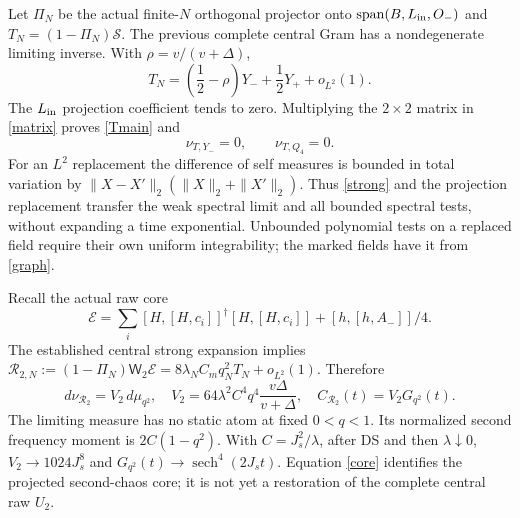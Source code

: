 \documentclass[11pt,a4paper]{article}
\newcommand{\W}{\mathsf W_2}
\begin{document}
Let $\Pi_N$ be the actual finite-$N$ orthogonal projector onto
$\operatorname{span}(B,L_{\rm in},O_-)$ and
$T_N=(1-\Pi_N)\mathcal S$. The previous complete central Gram
has a nondegenerate limiting inverse. With $\rho=v/(v+\Delta)$,
\begin{equation}
 T_N=\left(\frac12-\rho\right)Y_-+\frac12Y_++o_{L^2}(1).
\end{equation}
The $L_{\rm in}$ projection coefficient tends to zero. Multiplying
the $2\times2$ matrix in \eqref{matrix} proves \eqref{Tmain} and
\begin{equation}
 \nu_{T,Y_-}=0,\qquad \nu_{T,Q_4}=0.
\end{equation}
For an $L^2$ replacement the difference of self measures is bounded
in total variation by
$\|X-X'\|_2(\|X\|_2+\|X'\|_2)$. Thus \eqref{strong} and the
projection replacement transfer the weak spectral limit and all
bounded spectral tests, without expanding a time exponential.
Unbounded polynomial tests on a replaced field require their own
uniform integrability; the marked fields have it from \eqref{graph}.

Recall the actual raw core
\begin{equation}
 \mathcal E=\sum_i[H,[H,c_i]]^\dagger[H,[H,c_i]]+[h,[h,A_-]]/4.
\end{equation}
The established central strong expansion implies
$\mathcal R_{2,N}:=(1-\Pi_N)\W\mathcal E
=8\lambda_NC_mq_N^2T_N+o_{L^2}(1)$. Therefore
\begin{equation}
 \boxed{\ d\nu_{\mathcal R_2}=V_2\,d\mu_{q^2},\quad
 V_2=64\lambda^2C^4q^4\frac{v\Delta}{v+\Delta},\quad
 C_{\mathcal R_2}(t)=V_2G_{q^2}(t).\ }\label{core}
\end{equation}
The limiting measure has no static atom at fixed $0<q<1$.
Its normalized second frequency moment is $2C(1-q^2)$.
With $C=J_s^2/\lambda$, after DS and then $\lambda\downarrow0$,
$V_2\to1024J_s^8$ and $G_{q^2}(t)\to\operatorname{sech}^4(2J_st)$.
Equation \eqref{core} identifies the projected second-chaos core;
it is not yet a restoration of the complete central raw $U_2$.

\newpage
\end{document}
